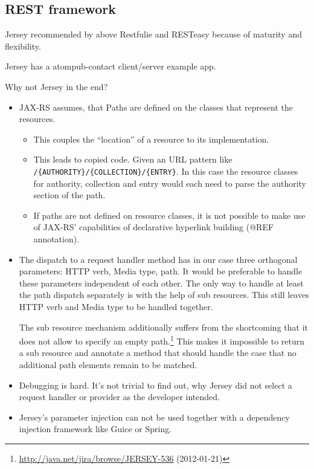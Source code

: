 \documentclass[12pt,a4paper]{scrartcl}		%
\newcommand{\citeurl}[2]{\url{#1} (#2)}
\begin{document}


\subsection{REST framework}
Jersey recommended by \cite{Kaiser2011} above Restfulie and RESTeasy because of maturity and flexibility.


Jersey has a atompub-contact client/server example app.

Why not Jersey in the end?
\begin{itemize}
\item JAX-RS assumes, that Paths are defined on the classes that represent the resources.
  \begin{itemize}
  \item This couples the ``location'' of a resource to its implementation.
  \item This leads to copied code. Given an URL pattern like
    \verb:/{AUTHORITY}/{COLLECTION}/{ENTRY}:. In this case the resource classes
    for authority, collection and entry would each need to parse the authority
    section of the path.
  \item If paths are not defined on resource classes, it is not possible to make use of JAX-RS' capabilities of declarative hyperlink building (@REF annotation).
  \end{itemize}
\item The dispatch to a request handler method has in our case three orthogonal
  parameters: HTTP verb, Media type, path. It would be preferable to handle
  these parameters independent of each other. The only way to handle at least
  the path dispatch separately is with the help of sub resources. This still
  leaves HTTP verb and Media type to be handled together.

  The sub resource mechanism additionally suffers from the shortcoming that it does not allow to specify an empty path.\footnote{\citeurl{http://java.net/jira/browse/JERSEY-536}{2012-01-21}} This makes it impossible to return a sub resource and annotate a method that should handle the case that no additional path elements remain to be matched.

\item Debugging is hard. It's not trivial to find out, why Jersey did not select a request handler or provider as the developer intended.
\item Jersey's parameter injection can not be used together with a dependency injection framework like Guice or Spring.
\end{itemize}
\end{document}
